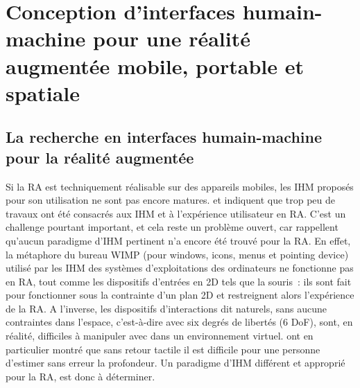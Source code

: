 \section*{Conception d'interfaces humain-machine pour une réalité augmentée mobile, portable et spatiale}
\subsection*{La recherche en interfaces humain-machine pour la réalité augmentée}
Si la RA est techniquement réalisable sur des appareils mobiles, les IHM proposés pour son utilisation ne sont pas encore matures. \citet{ZhouDuhBillinghurst2008} et \citet{DeSaChurchill2013} indiquent que trop peu de travaux ont été consacrés aux IHM et à l'expérience utilisateur en RA. C'est un challenge pourtant important, et cela reste un problème ouvert, car \citet{VanKrevelenPoelman2010} rappellent qu'aucun paradigme d'IHM pertinent n'a encore été trouvé pour la RA. En effet, la métaphore du bureau WIMP (pour \foreignlanguage{english}{windows}, \foreignlanguage{english}{icons}, \foreignlanguage{english}{menus} et \foreignlanguage{english}{pointing device}) utilisé par les IHM des systèmes d'exploitations des ordinateurs ne fonctionne pas en RA, tout comme les dispositifs d'entrées en 2D tels que la souris~: ils sont fait pour fonctionner sous la contrainte d'un plan 2D et restreignent alors l'expérience de la RA. \citep{VanKrevelenPoelman2010} A l'inverse, les dispositifs d'interactions dit naturels, sans aucune contraintes dans l'espace, c'est-à-dire avec six degrés de libertés (6 DoF), sont, en réalité, difficiles à manipuler avec dans un environnement virtuel. \citet{ChanKaoChenEtAl2010} ont en particulier montré que sans retour tactile il est difficile pour une personne d'estimer sans erreur la profondeur. Un paradigme d'IHM différent et approprié pour la RA, est donc à déterminer.

